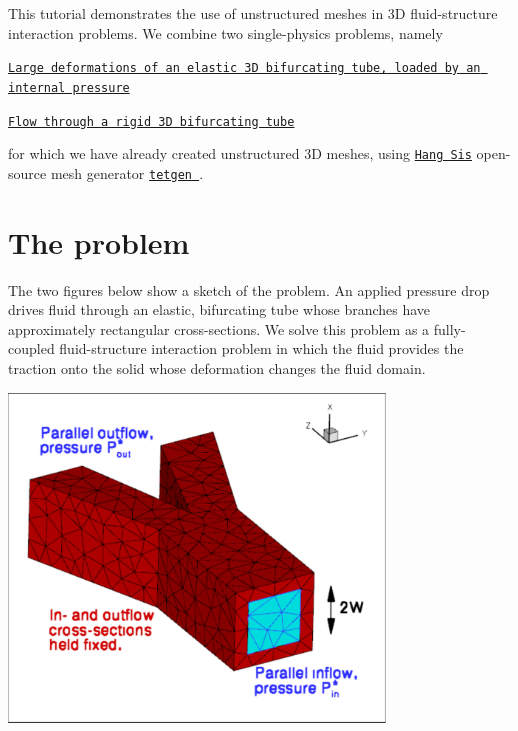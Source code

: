This tutorial demonstrates the use of unstructured meshes in 3D fluid-\/structure interaction problems. We combine two single-\/physics problems, namely
\begin{DoxyItemize}
\item \href{../../../solid/unstructured_three_d_solid/html/index.html}{\tt Large deformations of an elastic 3D bifurcating tube, loaded by an internal pressure} ~\newline
~\newline

\item \href{../../../navier_stokes/unstructured_three_d_fluid/html/index.html}{\tt Flow through a rigid 3D bifurcating tube}
\end{DoxyItemize}for which we have already created unstructured 3D meshes, using \href{http://www.wias-berlin.de/~si }{\tt Hang Si\textquotesingle{}s} open-\/source mesh generator \href{http://wias-berlin.de/software/tetgen//}{\tt {\ttfamily tetgen} }.



 

\hypertarget{index_the_problem}{}\section{The problem}\label{index_the_problem}
The two figures below show a sketch of the problem. An applied pressure drop drives fluid through an elastic, bifurcating tube whose branches have approximately rectangular cross-\/sections. We solve this problem as a fully-\/coupled fluid-\/structure interaction problem in which the fluid provides the traction onto the solid whose deformation changes the fluid domain.

 
\begin{DoxyImage}
\includegraphics[width=0.75\textwidth]{problem_sketch_forward}
\end{DoxyImage}


